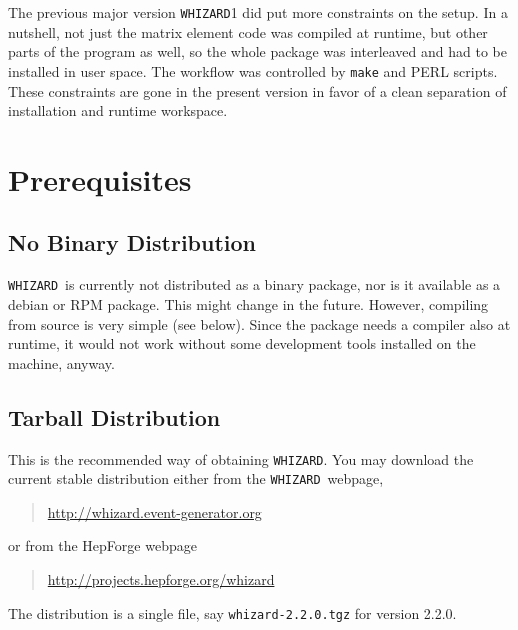 \documentclass[12pt]{book}
\newcommand{\whizardpage}{\url{http://whizard.event-generator.org}}
\newcommand{\hepforgepage}{\url{http://projects.hepforge.org/whizard}}
\newcommand{\ttt}[1]{\texttt{#1}}
\newcommand{\whizard}{\texttt{WHIZARD}}
\newcommand{\thisversion}{2.2.0}
\begin{document}
The previous major version \whizard1 did put more constraints on the
setup.  In a nutshell, not just the matrix element code was compiled
at runtime, but other parts of the program as well, so the whole
package was interleaved and had to be installed in user space.  The
workflow was controlled by \ttt{make} and PERL scripts.  These
constraints are gone in the present version in favor of a clean
separation of installation and runtime workspace.


\section{\label{sec:prerequisites}Prerequisites}

\subsection{No Binary Distribution}

\whizard\ is currently not distributed as a binary package, nor is it
available as a debian or RPM package.  This might change in the
future.  However, compiling from source is very simple (see below).
Since the package needs a compiler also at runtime, it would not work
without some development tools installed on the machine, anyway.


\subsection{Tarball Distribution}

This is the recommended way of obtaining \whizard.  You may download
the current stable distribution either from the \whizard\ webpage, 
\begin{quote}
  \whizardpage
\end{quote}
or from the HepForge webpage
\begin{quote}
  \hepforgepage
\end{quote}
The distribution is a single file, say \ttt{whizard-\thisversion.tgz} for
version \thisversion.
\end{document}
